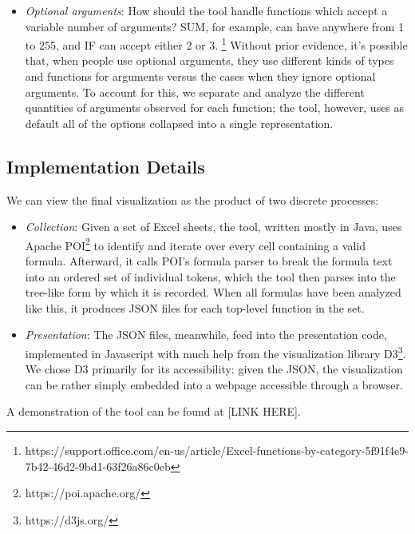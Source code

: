 \documentclass[conference]{IEEEtran}
\begin{document}
\begin{itemize}
	\item \textit{Optional arguments}: How should the tool handle functions which accept a variable number of arguments? SUM, for example, can have anywhere from 1 to 255, and IF can accept either 2 or 3. \footnote{https://support.office.com/en-us/article/Excel-functions-by-category-5f91f4e9-7b42-46d2-9bd1-63f26a86c0eb} Without prior evidence, it's possible that, when people use optional arguments, they use different kinds of types and functions for arguments versus the cases when they ignore optional arguments. To account for this, we separate and analyze the different quantities of arguments observed for each function; the tool, however, uses as default all of the options collapsed into a single representation.
\end{itemize}

\subsection{Implementation Details}
We can view the final visualization as the product of two discrete processes:
\begin{itemize}
	\item \textit{Collection}: Given a set of Excel sheets, the tool, written mostly in Java, uses Apache POI\footnote{https://poi.apache.org/} to identify and iterate over every cell containing a valid formula. Afterward, it calls POI's formula parser to break the formula text into an ordered set of individual tokens, which the tool then parses into the tree-like form by which it is recorded. When all formulas have been analyzed like this, it produces JSON files for each top-level function in the set.
	\item \textit{Presentation}: The JSON files, meanwhile, feed into the presentation code, implemented in Javascript with much help from the visualization library D3\footnote{https://d3js.org/}. We chose D3 primarily for its accessibility: given the JSON, the visualization can be rather simply embedded into a webpage accessible through a browser. 
\end{itemize}
A demonstration of the tool can be found at [LINK HERE].
\end{document}
